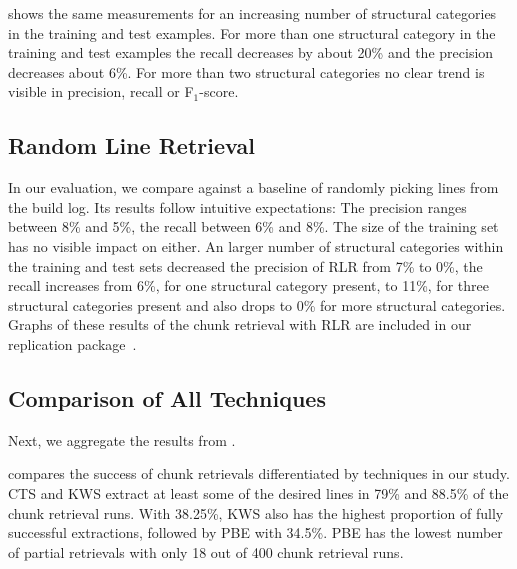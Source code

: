  shows the same
measurements for an increasing number of structural categories in the
training and test examples.
For more than one structural category in
the training and test examples the recall decreases by about 20\% and
the precision decreases about 6\%.
For more than two structural
categories no clear trend is visible in precision, recall or
F$_{1}$-score.

\subsection{Random Line Retrieval}
\label{sec:r:rlr}

In our evaluation, we compare against a baseline of randomly
picking lines from the build log.
Its results follow intuitive
expectations:
The precision ranges between 8\% and 5\%, the recall between 6\% and
8\%.
The size of the training set has no visible impact on either.
An larger number of structural categories within the training and
test sets decreased the precision of RLR from 7\% to 0\%, the recall
increases from 6\%, for one structural category present, to 11\%, for
three structural categories present and also drops to 0\% for more
structural categories.
Graphs of these results of the chunk retrieval with RLR
are included in our replication
package~\cite{brandt2020chunk-replication}.

\subsection{Comparison of All Techniques}
Next, we aggregate the results from
.

 compares the success of chunk
retrievals differentiated by techniques in our study.
CTS and KWS
extract at least some of the desired lines in 79\% and 88.5\%
of the chunk retrieval runs.
With 38.25\%, KWS also has the highest proportion of fully
successful extractions, followed by PBE with 34.5\%.
PBE has the
lowest number of partial retrievals with only 18 out of 400 chunk
retrieval runs.


